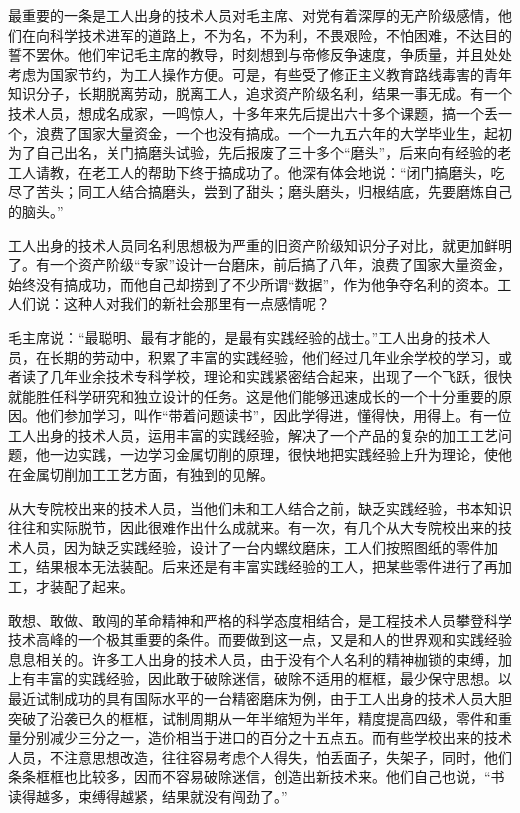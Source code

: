 \begin{maonote}
最重要的一条是工人出身的技术人员对毛主席、对党有着深厚的无产阶级感情，他们在向科学技术进军的道路上，不为名，不为利，不畏艰险，不怕困难，不达目的誓不罢休。他们牢记毛主席的教导，时刻想到与帝修反争速度，争质量，并且处处考虑为国家节约，为工人操作方便。可是，有些受了修正主义教育路线毒害的青年知识分子，长期脱离劳动，脱离工人，追求资产阶级名利，结果一事无成。有一个技术人员，想成名成家，一鸣惊人，十多年来先后提出六十多个课题，搞一个丢一个，浪费了国家大量资金，一个也没有搞成。一个一九五六年的大学毕业生，起初为了自己出名，关门搞磨头试验，先后报废了三十多个“磨头”，后来向有经验的老工人请教，在老工人的帮助下终于搞成功了。他深有体会地说：“闭门搞磨头，吃尽了苦头；同工人结合搞磨头，尝到了甜头；磨头磨头，归根结底，先要磨炼自己的脑头。”

工人出身的技术人员同名利思想极为严重的旧资产阶级知识分子对比，就更加鲜明了。有一个资产阶级“专家”设计一台磨床，前后搞了八年，浪费了国家大量资金，始终没有搞成功，而他自己却捞到了不少所谓“数据”，作为他争夺名利的资本。工人们说：这种人对我们的新社会那里有一点感情呢？

毛主席说：“最聪明、最有才能的，是最有实践经验的战士。”工人出身的技术人员，在长期的劳动中，积累了丰富的实践经验，他们经过几年业余学校的学习，或者读了几年业余技术专科学校，理论和实践紧密结合起来，出现了一个飞跃，很快就能胜任科学研究和独立设计的任务。这是他们能够迅速成长的一个十分重要的原因。他们参加学习，叫作“带着问题读书”，因此学得进，懂得快，用得上。有一位工人出身的技术人员，运用丰富的实践经验，解决了一个产品的复杂的加工工艺问题，他一边实践，一边学习金属切削的原理，很快地把实践经验上升为理论，使他在金属切削加工工艺方面，有独到的见解。

从大专院校出来的技术人员，当他们未和工人结合之前，缺乏实践经验，书本知识往往和实际脱节，因此很难作出什么成就来。有一次，有几个从大专院校出来的技术人员，因为缺乏实践经验，设计了一台内螺纹磨床，工人们按照图纸的零件加工，结果根本无法装配。后来还是有丰富实践经验的工人，把某些零件进行了再加工，才装配了起来。

敢想、敢做、敢闯的革命精神和严格的科学态度相结合，是工程技术人员攀登科学技术高峰的一个极其重要的条件。而要做到这一点，又是和人的世界观和实践经验息息相关的。许多工人出身的技术人员，由于没有个人名利的精神枷锁的束缚，加上有丰富的实践经验，因此敢于破除迷信，破除不适用的框框，最少保守思想。以最近试制成功的具有国际水平的一台精密磨床为例，由于工人出身的技术人员大胆突破了沿袭已久的框框，试制周期从一年半缩短为半年，精度提高四级，零件和重量分别减少三分之一，造价相当于进口的百分之十五点五。而有些学校出来的技术人员，不注意思想改造，往往容易考虑个人得失，怕丢面子，失架子，同时，他们条条框框也比较多，因而不容易破除迷信，创造出新技术来。他们自己也说，“书读得越多，束缚得越紧，结果就没有闯劲了。”


\end{maonote}
